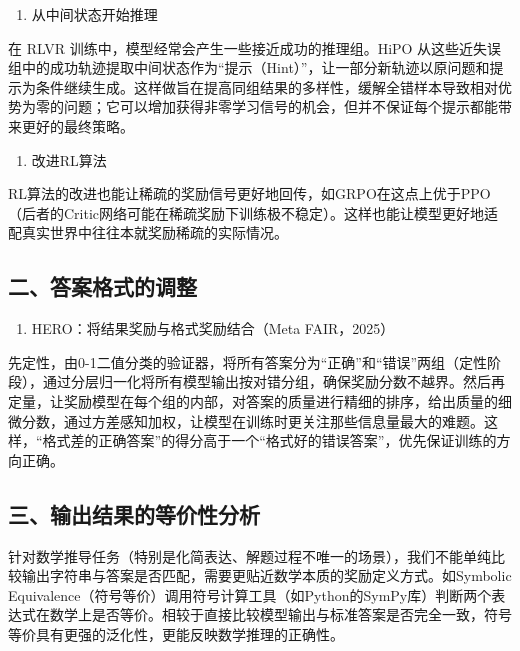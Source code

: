 \begin{enumerate}
\def\labelenumi{\arabic{enumi}.}
\setcounter{enumi}{3}
\tightlist
\item
  从中间状态开始推理
\end{enumerate}

在 RLVR 训练中，模型经常会产生一些接近成功的推理组。HiPO 从这些近失误组中的成功轨迹提取中间状态作为``提示（Hint）''，让一部分新轨迹以原问题和提示为条件继续生成。这样做旨在提高同组结果的多样性，缓解全错样本导致相对优势为零的问题；它可以增加获得非零学习信号的机会，但并不保证每个提示都能带来更好的最终策略。

\begin{enumerate}
\def\labelenumi{\arabic{enumi}.}
\setcounter{enumi}{4}
\tightlist
\item
  改进RL算法
\end{enumerate}

RL算法的改进也能让稀疏的奖励信号更好地回传，如GRPO在这点上优于PPO（后者的Critic网络可能在稀疏奖励下训练极不稳定）。这样也能让模型更好地适配真实世界中往往本就奖励稀疏的实际情况。

\hypertarget{ux4e8cux7b54ux6848ux683cux5f0fux7684ux8c03ux6574}{%
\subsection{二、答案格式的调整}\label{ux4e8cux7b54ux6848ux683cux5f0fux7684ux8c03ux6574}}

\begin{enumerate}
\def\labelenumi{\arabic{enumi}.}
\tightlist
\item
  HERO：将结果奖励与格式奖励结合（Meta FAIR，2025）
\end{enumerate}

先定性，由0-1二值分类的验证器，将所有答案分为``正确''和``错误''两组（定性阶段），通过分层归一化将所有模型输出按对错分组，确保奖励分数不越界。然后再定量，让奖励模型在每个组的内部，对答案的质量进行精细的排序，给出质量的细微分数，通过方差感知加权，让模型在训练时更关注那些信息量最大的难题。这样，``格式差的正确答案''的得分高于一个``格式好的错误答案''，优先保证训练的方向正确。

\hypertarget{ux4e09ux8f93ux51faux7ed3ux679cux7684ux7b49ux4ef7ux6027ux5206ux6790}{%
\subsection{三、输出结果的等价性分析}\label{ux4e09ux8f93ux51faux7ed3ux679cux7684ux7b49ux4ef7ux6027ux5206ux6790}}

针对数学推导任务（特别是化简表达、解题过程不唯一的场景），我们不能单纯比较输出字符串与答案是否匹配，需要更贴近数学本质的奖励定义方式。如Symbolic Equivalence（符号等价）调用符号计算工具（如Python的SymPy库）判断两个表达式在数学上是否等价。相较于直接比较模型输出与标准答案是否完全一致，符号等价具有更强的泛化性，更能反映数学推理的正确性。

